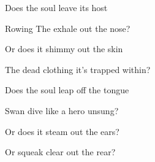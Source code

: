 \documentclass{article}
\begin{document}
\newline

Does the soul leave its host
\newline

Rowing The exhale out the nose? 
\newline

Or does it shimmy out the skin 
\newline

The dead clothing it's trapped within? 
\newline

Does the soul leap off the tongue
\newline

Swan dive like a hero unsung?
\newline

Or does it steam out the ears?
\newline

Or squeak clear out the rear?
\newline
\end{document}
